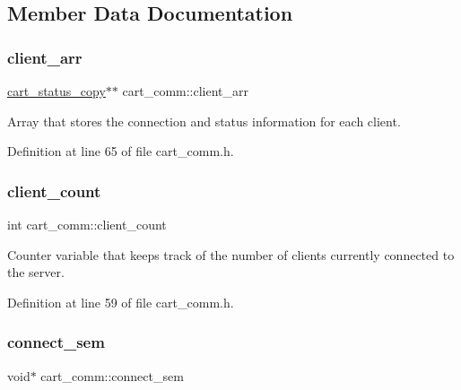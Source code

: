 \subsection{Member Data Documentation}
\mbox{\label{classcart__comm_ae5a8dcabaa03d74ec04a5590e738a596}} 
\subsubsection{\texorpdfstring{client\+\_\+arr}{client\_arr}}
{\footnotesize\ttfamily \mbox{\hyperlink{classcart__status__copy}{cart\+\_\+status\+\_\+copy}}$\ast$$\ast$ cart\+\_\+comm\+::client\+\_\+arr\hspace{0.3cm}{\ttfamily [private]}}

Array that stores the connection and status information for each client. 

Definition at line 65 of file cart\+\_\+comm.\+h.

\mbox{\label{classcart__comm_ad335e930dcf3978785a97841e8affe52}} 
\subsubsection{\texorpdfstring{client\+\_\+count}{client\_count}}
{\footnotesize\ttfamily int cart\+\_\+comm\+::client\+\_\+count\hspace{0.3cm}{\ttfamily [private]}}

Counter variable that keeps track of the number of clients currently connected to the server. 

Definition at line 59 of file cart\+\_\+comm.\+h.

\mbox{\label{classcart__comm_ab7920bad120f065ea615161aa31c9d7e}} 
\subsubsection{\texorpdfstring{connect\+\_\+sem}{connect\_sem}}
{\footnotesize\ttfamily void$\ast$ cart\+\_\+comm\+::connect\+\_\+sem\hspace{0.3cm}{\ttfamily [private]}}

